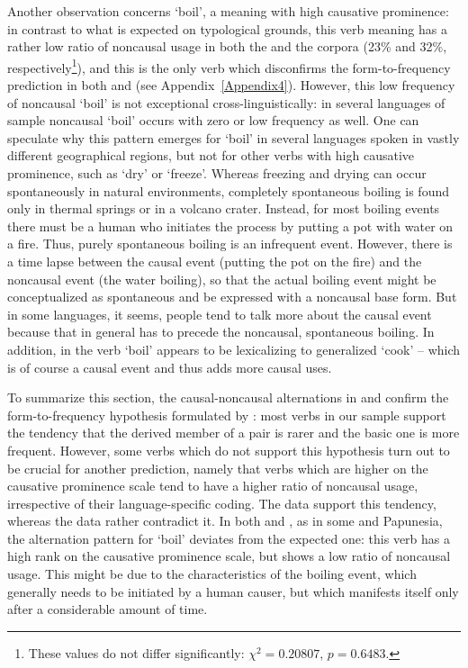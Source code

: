 \documentclass[output=paper,colorlinks,citecolor=brown]{langscibook}
\begin{document}
Another observation concerns ‘boil’, a meaning with high causative prominence: in contrast to what is expected on typological grounds, this verb meaning has a rather low ratio of noncausal usage in both the  and the  corpora (23\% and 32\%, respectively\footnote{These values do not differ significantly: $\chi^2 = 0.20807$, $p = 0.6483$.}), and this is the only verb which disconfirms the form-to-frequency prediction in both  and  (see Appendix~\ref{Appendix4}). However, this low frequency of noncausal ‘boil’ is not exceptional cross-linguistically: in several languages of  sample noncausal ‘boil’ occurs with zero or low frequency as well. One can speculate why this pattern emerges for ‘boil’ in several languages spoken in vastly different geographical regions, but not for other verbs with high causative prominence, such as ‘dry’ or ‘freeze’. Whereas freezing and drying can occur spontaneously in natural environments, completely spontaneous boiling is found only in thermal springs or in a volcano crater. Instead, for most boiling events there must be a human who initiates the process by putting a pot with water on a fire. Thus, purely spontaneous boiling is an infrequent event. However, there is a time lapse between the causal event (putting the pot on the fire) and the noncausal event (the water boiling), so that the actual boiling event might be conceptualized as spontaneous and be expressed with a noncausal base form. But in some languages, it seems, people tend to talk more about the causal event because that in general has to precede the noncausal, spontaneous boiling. In addition, in  the verb ‘boil’ appears to be lexicalizing to generalized ‘cook’ – which is of course a causal event and thus adds more causal uses.

To summarize this section, the causal-noncausal alternations in  and  confirm the form-to-frequency hypothesis formulated by \citet[597]{Haspelmathetal2014}: most verbs in our sample support the tendency that the derived member of a pair is rarer and the basic one is more frequent. However, some verbs which do not support this hypothesis turn out to be crucial for another prediction, namely that verbs which are higher on the causative prominence scale tend to have a higher ratio of noncausal usage, irrespective of their language-specific coding. The  data support this tendency, whereas the  data rather contradict it. In both  and , as in some  and Papunesia, the alternation pattern for ‘boil’ deviates from the expected one: this verb has a high rank on the causative prominence scale, but shows a low ratio of noncausal usage. This might be due to the characteristics of the boiling event, which generally needs to be initiated by a human causer, but which manifests itself only after a considerable amount of time.
\end{document}
